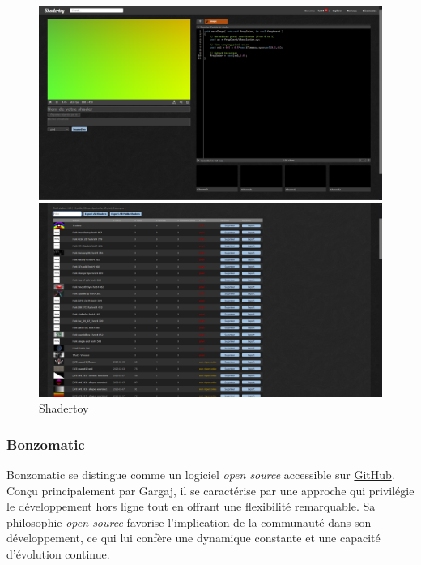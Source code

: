 \begin{figure}[h]
  \begin{minipage}[b]{0.45\linewidth}
    \centering
    \includegraphics[width=\linewidth]{images/demoscene/shadertoy01.PNG}
  \end{minipage}
  \hfill
  \begin{minipage}[b]{0.45\linewidth}
    \centering
    \includegraphics[width=\linewidth]{images/demoscene/shadertoy00.PNG}
  \end{minipage}
  \caption{Shadertoy}
  \label{shadertoy000}
\end{figure}



\subsubsection*{Bonzomatic}

Bonzomatic se distingue comme un logiciel \textit{open source} accessible sur \href{https://github.com/Gargaj/Bonzomatic}{GitHub}. Conçu principalement par Gargaj, il se caractérise par une approche qui privilégie le développement hors ligne tout en offrant une flexibilité remarquable. Sa philosophie \textit{open source} favorise l'implication de la communauté dans son développement, ce qui lui confère une dynamique constante et une capacité d'évolution continue.

